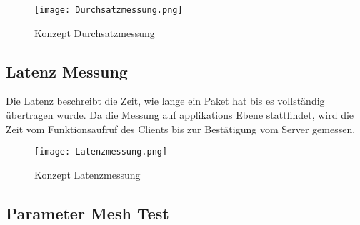 \begin{figure}[H]
	\centering
	\texttt{[image: Durchsatzmessung.png]}
	\caption{Konzept Durchsatzmessung}\label{fig:KonzeptDurchsatzmessung}
\end{figure}

\subsection{Latenz Messung}\label{subsec:LatenzMessung}
Die Latenz beschreibt die Zeit, wie lange ein Paket hat bis es vollständig übertragen wurde. Da die Messung auf applikations Ebene stattfindet, wird die Zeit vom Funktionsaufruf des Clients bis zur Bestätigung vom Server gemessen. 

\begin{figure}[H]
	\centering
	\texttt{[image: Latenzmessung.png]}
	\caption{Konzept Latenzmessung}\label{fig:Konzept Latenzmessung}
\end{figure}
\newpage





\subsection{Parameter Mesh Test}\label{subsec:ParameterMeshTest}



